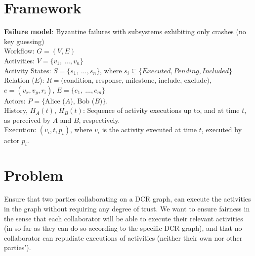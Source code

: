 \documentclass{article}
\begin{document}
	\section*{Framework}
	\textbf{Failure model}: Byzantine failures with subsystems exhibiting only crashes (no key guessing)\\
	\noindent
	Workflow: $G=(V,E)$ \\
	Activities: $V=\{v_1,\ \dots, v_n\}$ \\ %
	Activity States: $S=\{s_1,\ \dots, s_n\}$, where $s_i \subseteq \{Executed, Pending, Included\}$\\
	Relation ($E$): $R=($condition, response, milestone, include, exclude$)$, $e=(v_x, v_y, r_i)$, $E=\{e_1,\ \dots, e_m\}$\\
	Actors: $P =\{$Alice ($A$), Bob ($B$)$\}$.\\ %
	History, $H_A(t)$, $H_B(t)$: Sequence of activity executions up to, and at time $t$, as perceived by $A$ and $B$, respectively.\\
	Execution: $(v_i, t, p_i)$, where $v_i$ is the activity executed at time $t$, executed by actor $p_i$.\\

	\section*{Problem}
	Ensure that two parties collaborating on a DCR graph, can execute the activities in the graph without requiring any degree of trust. We want to ensure fairness in the sense that each collaborator will be able to execute their relevant activities (in so far as they can do so according to the specific DCR graph), and that no collaborator can repudiate executions of activities (neither their own nor other parties').
\end{document}
